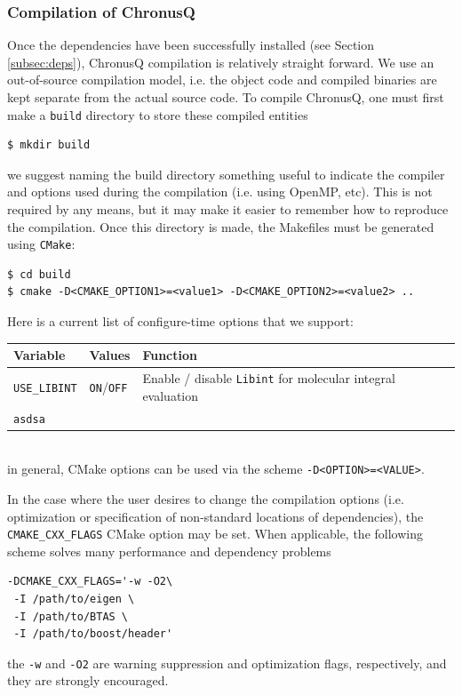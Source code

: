 \documentclass[12pt]{article}
\begin{document}
\subsubsection{Compilation of ChronusQ} \label{subsubsec:chronusqcomp}
Once the dependencies have been successfully installed (see Section \ref{subsec:deps}), ChronusQ compilation is relatively straight forward. We use an out-of-source compilation model, i.e. the object code and compiled binaries are kept separate from the actual source code. To compile ChronusQ, one must first make a \texttt{build} directory to store these compiled entities
\begin{lstlisting}
$ mkdir build
\end{lstlisting}
we suggest naming the build directory something useful to indicate the compiler and options used during the compilation (i.e. using OpenMP, etc). This is not required by any means, but it may make it easier to remember how to reproduce the compilation. Once this directory is made, the Makefiles must be generated using \texttt{CMake}:
\begin{lstlisting}
$ cd build
$ cmake -D<CMAKE_OPTION1>=<value1> -D<CMAKE_OPTION2>=<value2> ..
\end{lstlisting}
Here is a current list of configure-time options that we support:
\begin{table}[h!]
\begin{center}
\begin{tabular}{|l|l|l|}
\hline
Variable & Values & Function\\
\hline
\hline
\texttt{USE\_LIBINT} & \texttt{ON}/\texttt{OFF} & Enable / disable \texttt{Libint} for molecular integral evaluation\\
\hline
\texttt{asdsa} \\ 
\hline
\end{tabular}
\end{center}
\end{table}
\\in general, CMake options can be used via the scheme \texttt{-D<OPTION>=<VALUE>}.

In the case where the user desires to change the compilation options (i.e. optimization or specification of non-standard locations of dependencies), the \texttt{CMAKE\_CXX\_FLAGS} CMake option may be set. When applicable, the following scheme solves many performance and dependency problems
\begin{lstlisting}
-DCMAKE_CXX_FLAGS='-w -O2\
 -I /path/to/eigen \ 
 -I /path/to/BTAS \
 -I /path/to/boost/header'
\end{lstlisting}
the \texttt{-w} and \texttt{-O2} are warning suppression and optimization flags, respectively, and they are strongly encouraged.
\end{document}
